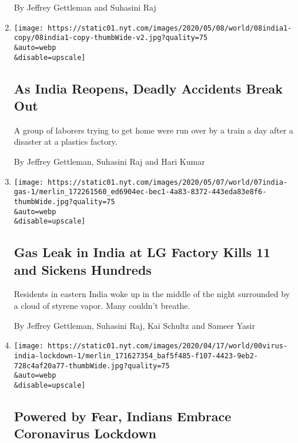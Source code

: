 \begin{enumerate}
  By Jeffrey Gettleman and Suhasini Raj
\item
  \href{/2020/05/08/world/asia/india-leak-train-reopen.html}{}

  \texttt{[image: https://static01.nyt.com/images/2020/05/08/world/08india1-copy/08india1-copy-thumbWide-v2.jpg?quality=75\\\&auto=webp\\\&disable=upscale]}

  \hypertarget{as-india-reopens-deadly-accidents-break-out}{%
  \subsection{As India Reopens, Deadly Accidents Break
  Out}\label{as-india-reopens-deadly-accidents-break-out}}

  A group of laborers trying to get home were run over by a train a day
  after a disaster at a plastics factory.

  By Jeffrey Gettleman, Suhasini Raj and Hari Kumar
\item
  \href{/2020/05/07/world/asia/india-lg-gas.html}{}

  \texttt{[image: https://static01.nyt.com/images/2020/05/07/world/07india-gas-1/merlin\_172261560\_ed6904ec-bec1-4a83-8372-443eda83e8f6-thumbWide.jpg?quality=75\\\&auto=webp\\\&disable=upscale]}

  \hypertarget{gas-leak-in-india-at-lg-factory-kills-11-and-sickens-hundreds}{%
  \subsection{Gas Leak in India at LG Factory Kills 11 and Sickens
  Hundreds}\label{gas-leak-in-india-at-lg-factory-kills-11-and-sickens-hundreds}}

  Residents in eastern India woke up in the middle of the night
  surrounded by a cloud of styrene vapor. Many couldn't breathe.

  By Jeffrey Gettleman, Suhasini Raj, Kai Schultz and Sameer Yasir
\item
  \href{/2020/04/19/world/asia/india-coronavirus-lockdown.html}{}

  \texttt{[image: https://static01.nyt.com/images/2020/04/17/world/00virus-india-lockdown-1/merlin\_171627354\_baf5f485-f107-4423-9eb2-728c4af20a77-thumbWide.jpg?quality=75\\\&auto=webp\\\&disable=upscale]}

  \hypertarget{powered-by-fear-indians-embrace-coronavirus-lockdown}{%
  \subsection{Powered by Fear, Indians Embrace Coronavirus
  Lockdown}\label{powered-by-fear-indians-embrace-coronavirus-lockdown}}


\end{enumerate}
